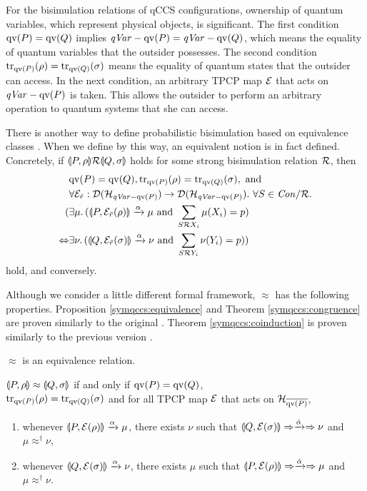 For the bisimulation relations of qCCS configurations, ownership of
quantum variables, which represent physical objects, is significant.
The first condition $\mathrm{qv}(P)=\mathrm{qv}(Q)$ implies $\mathit{qVar} - \mathrm{qv}(P) = 
\mathit{qVar} - \mathrm{qv}(Q)$, which means the equality of quantum variables
that the outsider possesses. The second condition
${\rm tr}_{\mathrm{qv}(P)}(\rho)={\rm tr}_{\mathrm{qv}(Q)}(\sigma)$ means the equality of quantum
states that the outsider can access. In the next condition, 
an arbitrary TPCP map $\mathcal{E}$ that acts on $\mathit{qVar} - \mathrm{qv}(P)$ is taken.
This allows the outsider to perform an arbitrary operation to quantum
systems that she can access.

\begin{rem}
 There is another way to define probabilistic bisimulation based on
 equivalence classes \cite{Larsen1991, Goubault2007, Davidson-etal2012}.
 When we define by this way, an equivalent notion is in fact defined.
 Concretely, if $\llparenthesis P, \rho \rrparenthesis \mathcal{R} \llparenthesis Q, \sigma \rrparenthesis$ holds for some 
 strong bisimulation relation $\mathcal{R}$, then 
 \begin{align*}
  & \mathrm{qv}(P) = \mathrm{qv}(Q), {\rm tr}_{\mathrm{qv}(P)}(\rho) = {\rm tr}_{\mathrm{qv}(Q)}(\sigma), \mbox{ and }\\
  &\forall \mathcal{E}_{\tilde r}:\mathcal{D}(\mathcal{H}_{\mathit{qVar} - \mathrm{qv}(P)})\rightarrow \mathcal{D}(\mathcal{H}_{\mathit{qVar}
  - \mathrm{qv}(P)}). ~ \forall S \in \mathit{Con}/\mathcal{R}.\\
  (&\exists \mu.\,(\llparenthesis P, \mathcal{E}_{\tilde r}(\rho) \rrparenthesis \xrightarrow{\alpha} \mu \mbox{ and }
  \sum_{S \mathcal{R} X_i} \mu(X_i)=p)\\
  \Leftrightarrow&
 \exists \nu.\,(\llparenthesis Q, \mathcal{E}_{\tilde r}(\sigma) \rrparenthesis \xrightarrow{\alpha} \nu \mbox{ and }
 \sum_{S \mathcal{R} Y_i} \nu(Y_i)=p))
 \end{align*}
hold, and conversely.
\end{rem}

Although we consider a little different formal framework,
$\approx$ has the following properties.
Proposition \ref{symqccs:equivalence} and Theorem 
\ref{symqccs:congruence} are proven similarly to the
original \cite{DengFeng2012}.
Theorem \ref{symqccs:coinduction} is proven similarly to
the previous version \cite{FengDuanYing2011}.

\begin{prop}
\label{symqccs:equivalence}
 $\approx$ is an equivalence relation.
\end{prop}
\begin{thm}
\label{symqccs:coinduction}
$\llparenthesis P, \rho \rrparenthesis \approx \llparenthesis Q, \sigma \rrparenthesis$
if and only if
$\mathrm{qv}(P)=\mathrm{qv}(Q)$,\\
${\rm tr}_{\mathrm{qv}(P)}(\rho)={\rm tr}_{\mathrm{qv}(Q)}(\sigma)$ and
for all TPCP map $\mathcal{E}$ that acts on $\mathcal{H}_{\overline{\mathrm{qv}(P)}}$,
\begin{enumerate}
 \item whenever $\llparenthesis P, \mathcal{E}(\rho) \rrparenthesis \xrightarrow{\alpha} \mu$,
       there exists $\nu$ such that
       $\llparenthesis Q, \mathcal{E}(\sigma) \rrparenthesis\Rightarrow
       \xrightarrow{\hat \alpha} \Rightarrow \nu$ and
       $\mu \approx^\dagger \nu$,
 \item whenever $\llparenthesis Q, \mathcal{E}(\sigma) \rrparenthesis \xrightarrow{\alpha} \nu$,
       there exists $\mu$ such that
       $\llparenthesis P, \mathcal{E}(\rho) \rrparenthesis\Rightarrow
       \xrightarrow{\hat \alpha} \Rightarrow \mu$ and $\mu
       \approx^\dagger \nu$.
\end{enumerate}
\end{thm}

